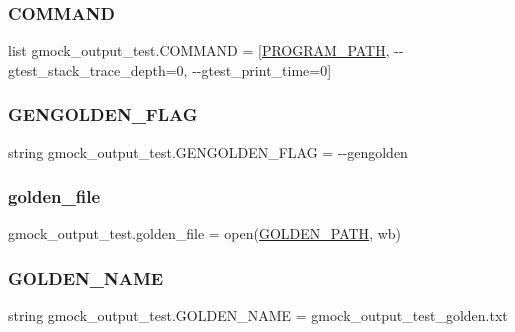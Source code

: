 \subsubsection{\texorpdfstring{COMMAND}{COMMAND}}
{\footnotesize\ttfamily list gmock\+\_\+output\+\_\+test.\+C\+O\+M\+M\+A\+ND = \mbox{[}\mbox{\hyperlink{namespacegmock__output__test_a03aac0fac952a0b3648340f529af7f59}{P\+R\+O\+G\+R\+A\+M\+\_\+\+P\+A\+TH}}, \textquotesingle{}-\/-\/gtest\+\_\+stack\+\_\+trace\+\_\+depth=0\textquotesingle{}, \textquotesingle{}-\/-\/gtest\+\_\+print\+\_\+time=0\textquotesingle{}\mbox{]}}

\mbox{\label{namespacegmock__output__test_a0bd3131fe8262154217588fed6b28d45}} 
\subsubsection{\texorpdfstring{GENGOLDEN\_FLAG}{GENGOLDEN\_FLAG}}
{\footnotesize\ttfamily string gmock\+\_\+output\+\_\+test.\+G\+E\+N\+G\+O\+L\+D\+E\+N\+\_\+\+F\+L\+AG = \textquotesingle{}-\/-\/gengolden\textquotesingle{}}

\mbox{\label{namespacegmock__output__test_aa592d26826a4dabf494fc2dd3c5c8b1e}} 
\subsubsection{\texorpdfstring{golden\_file}{golden\_file}}
{\footnotesize\ttfamily gmock\+\_\+output\+\_\+test.\+golden\+\_\+file = open(\mbox{\hyperlink{namespacegmock__output__test_a632c0fbf08500e4ed3c0e33f5e2ac771}{G\+O\+L\+D\+E\+N\+\_\+\+P\+A\+TH}}, \textquotesingle{}wb\textquotesingle{})}

\mbox{\label{namespacegmock__output__test_ac6e9298ea3967e6fa704c9c246d6cc18}} 
\subsubsection{\texorpdfstring{GOLDEN\_NAME}{GOLDEN\_NAME}}
{\footnotesize\ttfamily string gmock\+\_\+output\+\_\+test.\+G\+O\+L\+D\+E\+N\+\_\+\+N\+A\+ME = \textquotesingle{}gmock\+\_\+output\+\_\+test\+\_\+golden.\+txt\textquotesingle{}}

